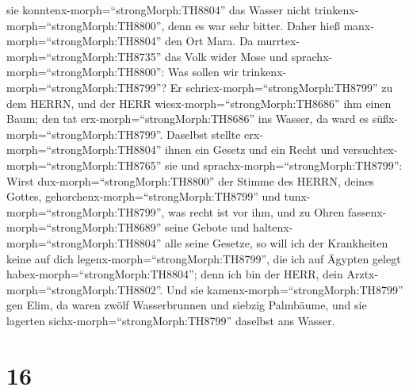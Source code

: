 sie konntenx-morph=``strongMorph:TH8804'' das Wasser nicht
trinkenx-morph=``strongMorph:TH8800'', denn es war sehr bitter. Daher
hieß manx-morph=``strongMorph:TH8804'' den Ort Mara.  Da
murrtex-morph=``strongMorph:TH8735'' das Volk wider Mose und
sprachx-morph=``strongMorph:TH8800'': Was sollen wir
trinkenx-morph=``strongMorph:TH8799''?  Er
schriex-morph=``strongMorph:TH8799'' zu dem HERRN, und der HERR
wiesx-morph=``strongMorph:TH8686'' ihm einen Baum; den tat
erx-morph=``strongMorph:TH8686'' ins Wasser, da ward es
süßx-morph=``strongMorph:TH8799''. Daselbst stellte
erx-morph=``strongMorph:TH8804'' ihnen ein Gesetz und ein Recht und
versuchtex-morph=``strongMorph:TH8765'' sie  und
sprachx-morph=``strongMorph:TH8799'': Wirst
dux-morph=``strongMorph:TH8800'' der Stimme des HERRN, deines Gottes,
gehorchenx-morph=``strongMorph:TH8799'' und
tunx-morph=``strongMorph:TH8799'', was recht ist vor ihm, und zu Ohren
fassenx-morph=``strongMorph:TH8689'' seine Gebote und
haltenx-morph=``strongMorph:TH8804'' alle seine Gesetze, so will ich der
Krankheiten keine auf dich legenx-morph=``strongMorph:TH8799'', die ich
auf Ägypten gelegt habex-morph=``strongMorph:TH8804''; denn ich bin der
HERR, dein Arztx-morph=``strongMorph:TH8802''.  Und sie
kamenx-morph=``strongMorph:TH8799'' gen Elim, da waren zwölf
Wasserbrunnen und siebzig Palmbäume, und sie lagerten
sichx-morph=``strongMorph:TH8799'' daselbst ans Wasser.

\hypertarget{section-15}{%
\section{16}\label{section-15}}

